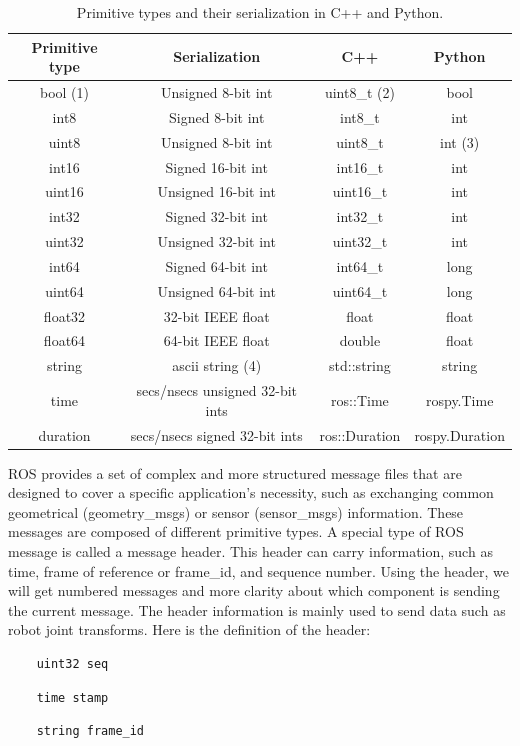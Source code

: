 \documentclass[../../main]{subfiles}
\begin{document}
\begin{table}[ht]
    \centering
\begin{tcolorbox}[
    colback=red!5!white,colframe=red!75!black,
    title={\textbf{Built-in Field Types for Message Definition}},
    fonttitle=\bfseries, coltitle=white, width=\linewidth
]
    \begin{tabular}{|c|c|c|c|}
    \hline
    \textbf{Primitive type} & \textbf{Serialization} & \textbf{C++} & \textbf{Python} \\ \hline
    bool (1) & Unsigned 8-bit int & uint8\_t (2) & bool \\ \hline
    int8 & Signed 8-bit int & int8\_t & int \\ \hline
    uint8 & Unsigned 8-bit int & uint8\_t & int (3) \\ \hline
    int16 & Signed 16-bit int & int16\_t & int \\ \hline
    uint16 & Unsigned 16-bit int & uint16\_t & int \\ \hline
    int32 & Signed 32-bit int & int32\_t & int \\ \hline
    uint32 & Unsigned 32-bit int & uint32\_t & int \\ \hline
    int64 & Signed 64-bit int & int64\_t & long \\ \hline
    uint64 & Unsigned 64-bit int & uint64\_t & long \\ \hline
    float32 & 32-bit IEEE float & float & float \\ \hline
    float64 & 64-bit IEEE float & double & float \\ \hline
    string & ascii string (4) & std::string & string \\ \hline
    time & secs/nsecs unsigned 32-bit ints & ros::Time & rospy.Time \\ \hline
    duration & secs/nsecs signed 32-bit ints & ros::Duration & rospy.Duration \\ \hline
    \end{tabular}
    \caption{Primitive types and their serialization in C++ and Python.}
    \label{tab:my_label}
\end{tcolorbox}
\end{table}

ROS provides a set of complex and more structured message files that are designed to cover a specific application's necessity, such as exchanging common geometrical (geometry\_msgs) or sensor (sensor\_msgs) information. These messages are composed of different primitive types. A special type of ROS message is called a message header. This header can carry information, such as time, frame of reference or frame\_id, and sequence number. Using the header, we will get numbered messages and more clarity about which component is sending the current message. The header information is mainly used to send data such as robot joint transforms. Here is the definition of the header:
\begin{verbatim}
    uint32 seq
\end{verbatim}
\begin{verbatim}
    time stamp
\end{verbatim}
\begin{verbatim}
    string frame_id
\end{verbatim}
\end{document}
